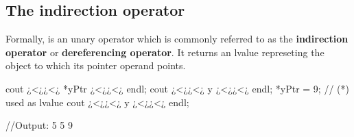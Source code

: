 \subsection{The indirection operator \CppCommonCode{(*)}}
Formally, \CppCommonCode{(*)} is an unary operator which is commonly referred to as the \textbf{indirection operator} or \textbf{dereferencing operator}. It returns an lvalue represeting the object to which its pointer operand points.\\
\begin{minipage}{\MPWxXSxLISTING\textwidth} %
{} %
\begin{CPPCode}
cout ¿<¿¿<¿ *yPtr ¿<¿¿<¿ endl;
cout ¿<¿¿<¿ y ¿<¿¿<¿ endl;
*yPtr = 9;                 // (*) used as lvalue
cout ¿<¿¿<¿ y ¿<¿¿<¿ endl;
\end{CPPCode}
\end{minipage}
\begin{minipage}{\MPWxXXXSxLISTING\textwidth} %
{} %
\begin{Terminal}
//Output:
5
5
9
\end{Terminal}
\end{minipage}


    


